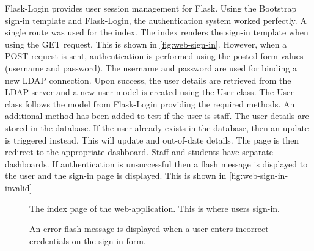 Flask-Login provides user session management for Flask. Using the Bootstrap sign-in template\cite{BootstrapSignInTemplate} and Flask-Login, the authentication system worked perfectly. A single route was used for the index. The index renders the sign-in template when using the GET request. This is shown in \autoref{fig:web-sign-in}. However, when a POST request is sent, authentication is performed using the posted form values (username and password). The username and password are used for binding a new LDAP connection. Upon success, the user details are retrieved from the LDAP server and a new user model is created using the User class. The User class follows the model from Flask-Login providing the required methods. An additional method has been added to test if the user is staff. The user details are stored in the database. If the user already exists in the database, then an update is triggered instead. This will update and out-of-date details. The page is then redirect to the appropriate dashboard. Staff and students have separate dashboards. If authentication is unsuccessful then a flash message is displayed to the user and the sign-in page is displayed. This is shown in \autoref{fig:web-sign-in-invalid}

\begin{figure}[H]
  \centering
  \caption[Web Sign-in Page]{The index page of the web-application. This is where users sign-in.}
  \label{fig:web-sign-in}
\end{figure}

\begin{figure}[H]
  \centering
  \caption[Web Invalid Sign-in Flash]{An error flash message is displayed when a user enters incorrect credentials on the sign-in form.}
  \label{fig:web-sign-in-invalid}
\end{figure}

